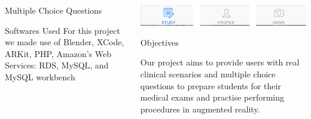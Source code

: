\documentclass[final]{beamer}
\newlength{\onecolwid}
\begin{document}
\begin{frame}[t]
\begin{columns}[t]
\begin{column}{\onecolwid}
\begin{block}{\LARGE Multiple Choice Questions}
\end{block}


\begin{block}{\LARGE Softwares Used}
\large
For this project we made use of Blender, XCode, ARKit, PHP, Amazon's Web Services: RDS, MySQL, and MySQL workbench
\end{block}


\end{column} %

\begin{column}{\onecolwid} %


\includegraphics[width=1\textwidth]{bar1.png}


\begin{alertblock}{\LARGE Objectives}

\large
Our project aims to provide users with real clinical scenarios and multiple choice questions to prepare students for their medical exams and practise performing procedures in augmented reality.

\end{alertblock}




\end{column}
\end{columns}
\end{frame}
\end{document}
